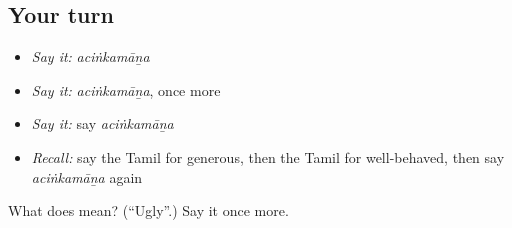 \subsection*{Your turn}
\begin{itemize}
\raggedright
  \item \emph{Say it:} \emph{aciṅkamāṉa}
  \item \emph{Say it:} \emph{aciṅkamāṉa}, once more
  \item \emph{Say it:} say \emph{aciṅkamāṉa}
  \item \emph{Recall:} say the Tamil for generous, then the Tamil for well-behaved, then say \emph{aciṅkamāṉa} again
\end{itemize}

\begin{tcolorbox}[breakable,colback=teal!4,colframe=teal!35!black,title={Before you move on}]
What does  mean? (\textquotedblleft{}Ugly\textquotedblright{}.) Say it once more.
\end{tcolorbox}
